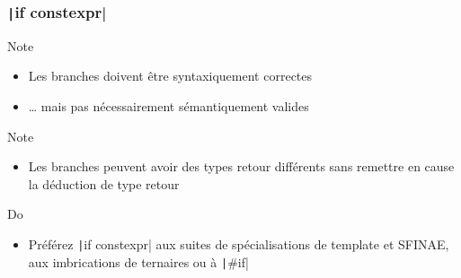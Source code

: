 \documentclass[C++.tex]{subfiles}
\begin{document}
\begin{frame}[fragile]
	\frametitle{\texttt|if constexpr|}
	\begin{block}{Note}
		\begin{itemize}
			\item Les branches doivent être syntaxiquement correctes 
			\item \ldots{} mais pas nécessairement sémantiquement valides
		\end{itemize}
	\end{block}

	\begin{block}{Note}
		\begin{itemize}
			\item Les branches peuvent avoir des types retour différents sans remettre en cause la déduction de type retour
		\end{itemize}
	\end{block}

	\begin{exampleblock}{Do}
		\begin{itemize}
			\item Préférez \texttt|if constexpr| aux suites de spécialisations de template et SFINAE, aux imbrications de ternaires ou à \texttt|#if|
		\end{itemize}
	\end{exampleblock}
\end{frame}
\end{document}
